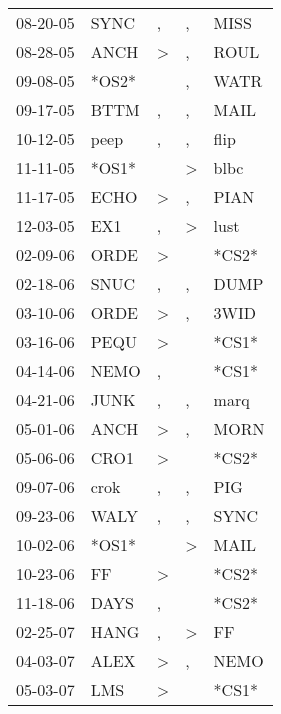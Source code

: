 \begin{supertabular}{lllll}
 08-20-05 &   SYNC &                , &                , &   MISS \\
 08-28-05 &   ANCH &     \textgreater &                , &   ROUL \\
 09-08-05 &  *OS2* &                  &                , &   WATR \\
 09-17-05 &   BTTM &                , &                , &   MAIL \\
 10-12-05 &   peep &                , &                , &   flip \\
 11-11-05 &  *OS1* &                  &     \textgreater &   blbc \\
 11-17-05 &   ECHO &     \textgreater &                , &   PIAN \\
 12-03-05 &    EX1 &                , &     \textgreater &   lust \\
 02-09-06 &   ORDE &     \textgreater &                  &  *CS2* \\
 02-18-06 &   SNUC &                , &                , &   DUMP \\
 03-10-06 &   ORDE &     \textgreater &                , &   3WID \\
 03-16-06 &   PEQU &     \textgreater &                  &  *CS1* \\
 04-14-06 &   NEMO &                , &                  &  *CS1* \\
 04-21-06 &   JUNK &                , &                , &   marq \\
 05-01-06 &   ANCH &     \textgreater &                , &   MORN \\
 05-06-06 &   CRO1 &     \textgreater &                  &  *CS2* \\
 09-07-06 &   crok &                , &                , &    PIG \\
 09-23-06 &   WALY &                , &                , &   SYNC \\
 10-02-06 &  *OS1* &                  &     \textgreater &   MAIL \\
 10-23-06 &     FF &     \textgreater &                  &  *CS2* \\
 11-18-06 &   DAYS &                , &                  &  *CS2* \\
 02-25-07 &   HANG &                , &     \textgreater &     FF \\
 04-03-07 &   ALEX &     \textgreater &                , &   NEMO \\
 05-03-07 &    LMS &     \textgreater &                  &  *CS1* \\

\end{supertabular}
